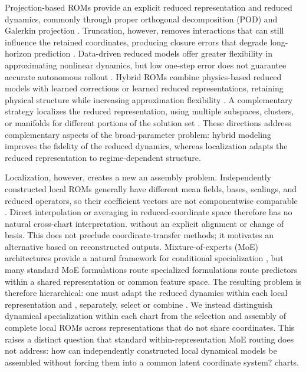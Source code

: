 \documentclass{article}
\providecommand{\DIFaddtex}[1]{{\protect\color{blue} \sf #1}} %
\providecommand{\DIFdeltex}[1]{{\protect\color{red} \scriptsize #1}} %
\providecommand{\DIFaddbegin}{} %
\providecommand{\DIFaddend}{} %
\providecommand{\DIFdelbegin}{} %
\providecommand{\DIFdelend}{} %
\providecommand{\DIFadd}[1]{\texorpdfstring{\DIFaddtex{#1}}{#1}} %
\providecommand{\DIFdel}[1]{\texorpdfstring{\DIFdeltex{#1}}{}} %
\providecommand{\DIFscaledelfig}{0.5}
\newlength{\DIFdelgraphicswidth} %
\newlength{\DIFdelgraphicsheight} %
\providecommand{\DIFaddincludegraphics}[2][]{{\color{blue}\fbox{\DIFOincludegraphics[#1]{#2}}}} %
\providecommand{\DIFdelincludegraphics}[2][]{%
\sbox{\DIFdelgraphicsbox}{\DIFOincludegraphics[#1]{#2}}%
\settoboxwidth{\DIFdelgraphicswidth}{\DIFdelgraphicsbox} %
\settoboxtotalheight{\DIFdelgraphicsheight}{\DIFdelgraphicsbox} %
\scalebox{\DIFscaledelfig}{%
\parbox[b]{\DIFdelgraphicswidth}{\usebox{\DIFdelgraphicsbox}\\[-\baselineskip] \rule{\DIFdelgraphicswidth}{0em}}\llap{\resizebox{\DIFdelgraphicswidth}{\DIFdelgraphicsheight}{%
\setlength{\unitlength}{\DIFdelgraphicswidth}%
\begin{picture}(1,1)%
\thicklines\linethickness{2pt} %
{\color[rgb]{1,0,0}\put(0,0){\framebox(1,1){}}}%
{\color[rgb]{1,0,0}\put(0,0){\line( 1,1){1}}}%
{\color[rgb]{1,0,0}\put(0,1){\line(1,-1){1}}}%
\end{picture}%
}\hspace*{3pt}}} %
} %
\DeclareRobustCommand{\DIFaddbegin}{\DIFOaddbegin \let\includegraphics\DIFaddincludegraphics} %
\DeclareRobustCommand{\DIFaddend}{\DIFOaddend \let\includegraphics\DIFOincludegraphics} %
\DeclareRobustCommand{\DIFdelbegin}{\DIFOdelbegin \let\includegraphics\DIFdelincludegraphics} %
\DeclareRobustCommand{\DIFdelend}{\DIFOaddend \let\includegraphics\DIFOincludegraphics} %
\begin{document}
Projection-based ROMs provide an explicit reduced representation and reduced dynamics, commonly through proper orthogonal decomposition (POD) and
Galerkin projection \citep{sirovich1987,berkooz1993,benner2015}. Truncation, however, removes interactions that can still influence the retained coordinates, producing closure errors that degrade long-horizon prediction \citep{amsallem2012}. Data-driven reduced models offer greater flexibility in approximating nonlinear dynamics, but low one-step error does not guarantee accurate autonomous rollout \citep{vlachas2018,duraisamy2019,brunton2020}. Hybrid ROMs combine physics-based reduced models with learned corrections or learned reduced representations, retaining physical structure while increasing approximation flexibility
\citep{dar2023,lee2020,fresca2022,geelen2023}. A complementary strategy localizes the reduced representation, using multiple subspaces, clusters, or manifolds for different portions of the solution set \citep{kaiser2014,li2021cluster,diaz2024}. These directions address complementary aspects of the broad-parameter problem: hybrid modeling improves the fidelity of the reduced dynamics, whereas localization adapts the reduced representation to regime-dependent structure.

Localization, however, creates \DIFdelbegin \DIFdel{a new }\DIFdelend \DIFaddbegin \DIFadd{an }\DIFaddend assembly problem. Independently constructed local ROMs generally have different mean fields, bases, scalings, and reduced operators, so their coefficient vectors are not componentwise comparable \DIFdelbegin \DIFdel{. Direct interpolation or averaging in reduced-coordinate space therefore has no natural cross-chart interpretation. }\DIFdelend \DIFaddbegin \DIFadd{without an explicit alignment or change of basis. This does not preclude coordinate-transfer methods; it motivates an alternative based on reconstructed outputs. }\DIFaddend Mixture-of-experts (MoE) architectures provide a \DIFdelbegin \DIFdel{natural }\DIFdelend framework for conditional specialization \citep{jacobs1991,jordan1994,shazeer2017,fedus2022}, but many \DIFdelbegin \DIFdel{standard MoE formulations route specialized }\DIFdelend \DIFaddbegin \DIFadd{formulations route }\DIFaddend predictors within a shared representation\DIFdelbegin \DIFdel{or common feature space. The resulting problem is therefore hierarchical: one must adapt the reduced dynamics within each local representation and , separately, select or combine }\DIFdelend \DIFaddbegin \DIFadd{. We instead distinguish dynamical specialization within each chart from the selection and assembly of }\DIFaddend complete local ROMs across \DIFdelbegin \DIFdel{representations that do not share coordinates.
This raises a distinct question that standard within-representation MoE routing does not address: how can independently constructed local dynamical models be assembled without forcing them into a common latent coordinate system?
}\DIFdelend \DIFaddbegin \DIFadd{charts.
}\DIFaddend 
\end{document}
